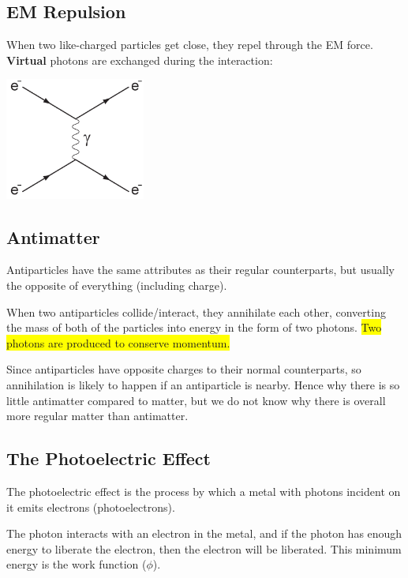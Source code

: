 \documentclass[a4paper, 12pt]{article}
\begin{document}
\subsection{EM Repulsion}

When two like-charged particles get close, they repel through the EM force. \textbf{Virtual} photons are exchanged during the interaction:

\begin{center}
\includegraphics[height=4cm]{images/emRepulsion.png}
\end{center}

\subsection{Antimatter}

Antiparticles have the same attributes as their regular counterparts, but usually the opposite of everything (including charge).

When two antiparticles collide/interact, they annihilate each other, converting the mass of both of the particles into energy in the form of two photons. \colorbox{yellow}{Two photons are produced to conserve momentum.}

Since antiparticles have opposite charges to their normal counterparts, so annihilation is likely to happen if an antiparticle is nearby. Hence why there is so little antimatter compared to matter, but we do not know why there is overall more regular matter than antimatter.
\newpage

\subsection{The Photoelectric Effect}

The photoelectric effect is the process by which a metal with photons incident on it emits electrons (photoelectrons).

The photon interacts with an electron in the metal, and if the photon has enough energy to liberate the electron, then the electron will be liberated. This minimum energy is the work function ($\phi$).
\end{document}
